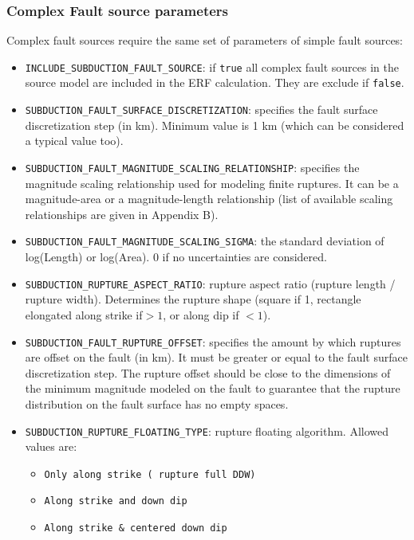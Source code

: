 \subsubsection{Complex Fault source parameters}
Complex fault sources require the same set of parameters of simple fault sources:
\begin{itemize}
\item \Verb+INCLUDE_SUBDUCTION_FAULT_SOURCE+: if \Verb+true+ all complex fault sources in the source model are included in the ERF calculation. They are exclude if \Verb+false+.
\item \Verb+SUBDUCTION_FAULT_SURFACE_DISCRETIZATION+:  specifies the fault surface discretization step (in km). Minimum value is 1 km (which can be considered a typical value too).
\item \Verb+SUBDUCTION_FAULT_MAGNITUDE_SCALING_RELATIONSHIP+:  specifies the magnitude scaling relationship used for modeling finite ruptures. It can be a magnitude-area or a magnitude-length relationship (list of available scaling relationships are given in Appendix B).
\item \Verb+SUBDUCTION_FAULT_MAGNITUDE_SCALING_SIGMA+: the standard deviation of log(Length) or log(Area). 0 if no uncertainties are considered.
\item \Verb+SUBDUCTION_RUPTURE_ASPECT_RATIO+: rupture aspect ratio (rupture length / rupture width). Determines the rupture shape (square if 1, rectangle elongated along strike if$ > 1$, or along dip if $< 1$).
\item \Verb+SUBDUCTION_FAULT_RUPTURE_OFFSET+: specifies the amount by which ruptures are offset on the fault (in km). It must be greater or equal to the fault surface discretization step. The rupture offset should be close to the dimensions of the minimum magnitude modeled on the fault to guarantee that the rupture distribution on the fault surface has no empty spaces.
\item \Verb+SUBDUCTION_RUPTURE_FLOATING_TYPE+: rupture floating algorithm. Allowed values are:
\begin{itemize}
\item \Verb+Only along strike ( rupture full DDW)+
\item \Verb+Along strike and down dip+
\item \Verb+Along strike & centered down dip+
\end{itemize}
\end{itemize}
